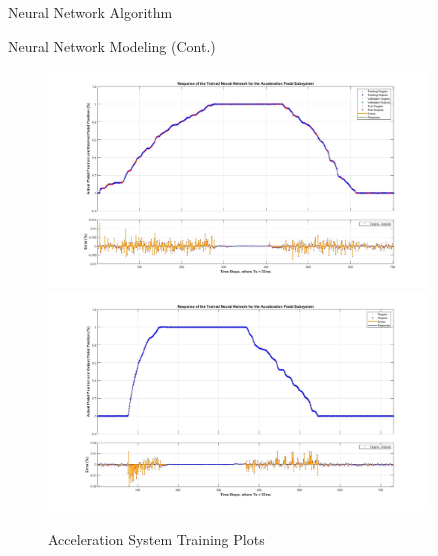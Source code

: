 \documentclass[final]{beamer}
\newlength{\sepwid}
\newlength{\onecolwid}
\begin{document}
\begin{frame}[t]
\begin{columns}[t]
\begin{column}{\onecolwid}
\begin{alertblock}{Neural Network Algorithm}
\vskip -2.5cm
\end{alertblock}

\begin{alertblock}{Neural Network Modeling (Cont.)}
\vskip 0.5cm

\begin{figure}
    \centering
		{\includegraphics[width=0.48\linewidth]{figs/img/accelNeuralNetworkTrainedOutput}}
		{\includegraphics[width=0.48\linewidth]{figs/img/accelNeuralNetworkTrainedOutput2}}
	\caption{Acceleration System Training Plots}
    \label{fig:AccelerationSysNeuralNetwork}
\end{figure}

\end{alertblock}



\end{column} %

\begin{column}{\sepwid}\end{column}

\begin{column}{\onecolwid} %



\end{column}
\end{columns}
\end{frame}
\end{document}
